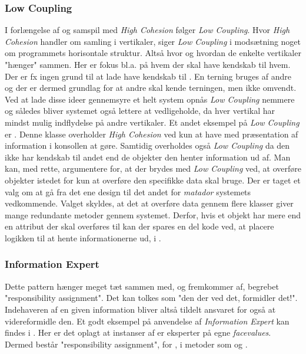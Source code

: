 \subsubsection{Low Coupling}\label{Chapter:Design patterns:Anvendelse:Low Coupling}
I forlængelse af og samspil med \textit{High Cohesion} følger \textit{Low Coupling}. Hvor \textit{High Cohesion} handler om samling i vertikaler, siger \textit{Low Coupling} i modsætning noget om programmets horisontale struktur. Altså hvor og hvordan de enkelte vertikaler "hænger" sammen. Her er fokus bl.a. på hvem der skal have kendskab til hvem. Der er fx ingen grund til at lade  have kendskab til . En terning bruges af andre og der er dermed grundlag for at andre skal kende terningen, men ikke omvendt. Ved at lade disse ideer gennemsyre et helt system opnås \textit{Low Coupling} nemmere og således bliver systemet også lettere at vedligeholde, da hver vertikal har mindst mulig indflydelse på andre vertikaler. Et andet eksempel på \textit{Low Coupling} er . Denne klasse overholder \textit{High Cohesion} ved kun at have med præsentation af information i konsollen at gøre. Samtidig overholdes også \textit{Low Coupling} da den ikke har kendskab til andet end de objekter den henter information ud af. Man kan, med rette, argumentere for, at der brydes med \textit{Low Coupling} ved, at overføre objekter istedet for kun at overføre den specifikke data  skal bruge. Der er taget et valg om at gå fra det ene design til det andet for \textit{matador} systemets vedkommende. Valget skyldes, at det at overføre data gennem flere klasser giver mange redundante metoder gennem systemet. Derfor, hvis et objekt har mere end en attribut der skal overføres til  kan der spares en del kode ved, at placere logikken til at hente informationerne ud, i .   

\subsubsection{Information Expert}\label{Chapter:Design patterns:Anvendelse:Information Expert}
Dette pattern hænger meget tæt sammen med, og fremkommer af, begrebet "responsibility assignment". Det kan tolkes som "den der ved det, formidler det!". Indehaveren af en given information bliver altså tildelt ansvaret for også at videreformidle den. Et godt eksempel på anvendelse af \textit{Information Expert} kan findes i . Her er det oplagt at instanser af  er eksperter på egne \textit{facevalues}. Dermed består "responsibility assignment", for , i metoder som  og . 

